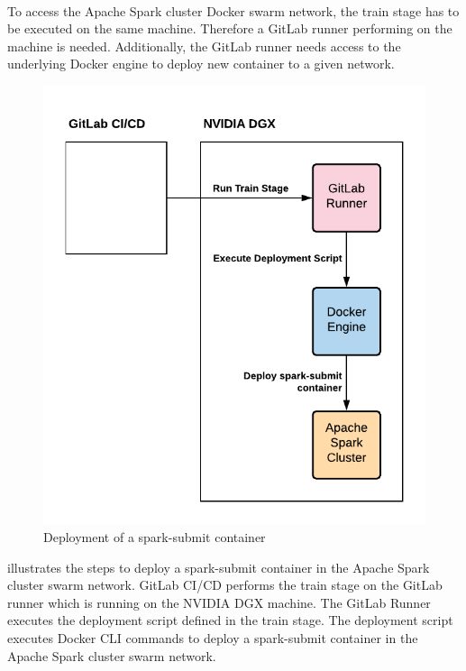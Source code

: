 \paragraph{}
To access the Apache Spark cluster Docker swarm network, the train stage has to be executed on the same machine.
Therefore a GitLab runner performing on the machine is needed. Additionally, the GitLab runner needs access to the underlying Docker engine to deploy new container to a given network.
\begin{figure}[h]
\centering
\includegraphics[scale=1]{images/05_conceptual_design/automated_deployment_pipeline/train_stage_runner}
\caption{Deployment of a spark-submit container}
\label{fig:05_deployment_train_concept}
\end{figure}
 illustrates the steps to deploy a spark-submit container in the Apache Spark cluster swarm network.
GitLab CI/CD performs the train stage on the GitLab runner which is running on the NVIDIA DGX machine.
The GitLab Runner executes the deployment script defined in the train stage.
The deployment script executes Docker CLI commands to deploy a spark-submit container in the Apache Spark cluster swarm network.


